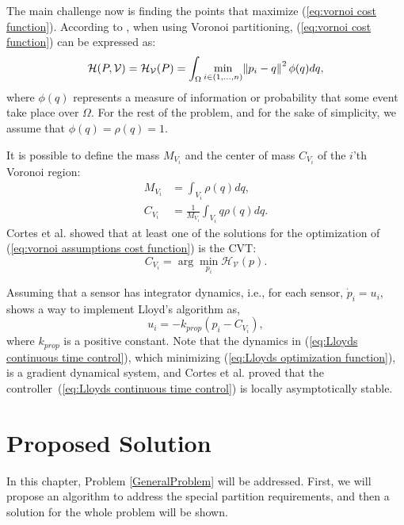\documentclass{iacas}
\begin{document}
The main challenge now is finding the points that maximize (\ref{eq:vornoi cost function}). According to \cite{Cortes2004}, when using Voronoi partitioning, (\ref{eq:vornoi cost function}) can be expressed as:
\begin{equation}
\mathcal{H}(P, \mathcal{V}) = \mathcal{H}_{\mathcal{V}}(P) = \int_{\Omega} \min_{i \in (1,\ldots, n)} \norm{p_i-q}^2 \phi(q) dq,
\label{eq:vornoi assumptions cost function}
\end{equation}
where $\phi(q)$ represents a measure of information or probability that some event take place over $\Omega$. For the rest of the problem, and for the sake of simplicity, we assume that $\phi(q) = \rho(q) = 1$.

It is possible to define the mass $M_{V_i}$ and the center of mass $C_{V_i}$ of the $i$'th Voronoi region:
\begin{align*}
M_{V_i} &= \int_{V_i} \rho(q)dq, \\
C_{V_i} &= \frac{1}{M_{V_i}} \int_{V_i} q\rho(q)dq.
\end{align*}
Cortes et al. \cite{Cortes2004} showed that at least one of the solutions for the optimization of (\ref{eq:vornoi assumptions cost function}) is the CVT:
\begin{equation}
C_{V_i} = \arg\min_{p_i} \mathcal{H}_{\mathcal{V}}(p).
\end{equation}

Assuming that a sensor has integrator dynamics, i.e., for each sensor, $\dot{p}_i = u_i$, \cite{Cortes2004} shows a way to implement Lloyd's algorithm as,
%
\begin{equation} \label{eq:Lloyds continuous time control}
u_{i} = -k_{prop}\left( p_i - C_{V_{i}} \right),
\end{equation} 
where $k_{prop}$ is a positive constant. Note that the dynamics in (\ref{eq:Lloyds continuous time control}), which minimizing (\ref{eq:Lloyds optimization function}), is a gradient dynamical system, and Cortes et al. \cite{Cortes2004} proved that the controller~(\ref{eq:Lloyds continuous time control}) is locally asymptotically stable.


\section{Proposed Solution}

In this chapter, Problem \ref{GeneralProblem} will be addressed. First, we will propose an algorithm to address the special partition requirements, and then a solution for the whole problem will be shown.
\end{document}

